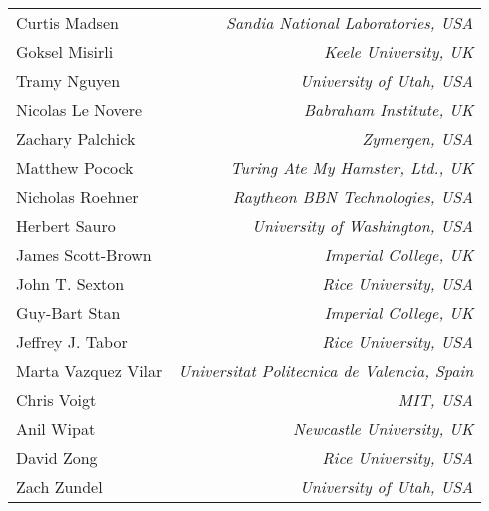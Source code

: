 \documentclass[finalspec]{sbmlpkgspec}
\newcommand{\tododeferred}[1]{\todo[color=cyan, inline]{#1}}
\begin{document}
{\begin{small}
\begin{tabular}{l>{\hspace*{15pt}}r}
Curtis Madsen & \emph{Sandia National Laboratories, USA}\\
Goksel Misirli & \emph{Keele University, UK}\\
Tramy Nguyen & \emph{University of Utah, USA}\\
Nicolas Le Novere & \emph{Babraham Institute, UK}\\
Zachary Palchick & \emph{Zymergen, USA}\\
Matthew Pocock & \emph{Turing Ate My Hamster, Ltd., UK}\\
Nicholas Roehner & \emph{Raytheon BBN Technologies, USA}\\
Herbert Sauro & \emph{University of Washington, USA}\\
James Scott-Brown & \emph{Imperial College, UK}\\
John T. Sexton & \emph{Rice University, USA}\\
Guy-Bart Stan & \emph{Imperial College, UK}\\
Jeffrey J. Tabor & \emph{Rice University, USA}\\
Marta Vazquez Vilar & \emph{Universitat Politecnica de Valencia, Spain}\\
Chris Voigt & \emph{MIT, USA}\\
Anil Wipat & \emph{Newcastle University, UK}\\
David Zong & \emph{Rice University, USA}\\
Zach Zundel & \emph{University of Utah, USA}\\
\end{tabular}
\end{small}
}



\maketitlepage

\maketableofcontents












\appendix
\appendixlabels







\newpage
\label{s:bibliography}

\end{document}
